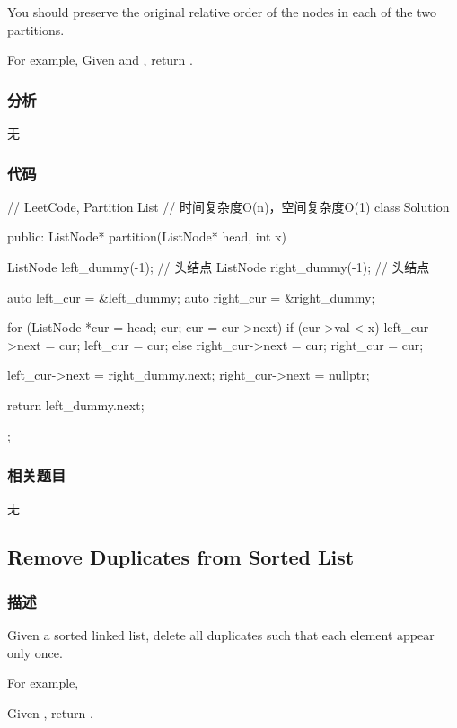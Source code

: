 You should preserve the original relative order of the nodes in each of the two 
partitions.

For example,
Given  and , return .


\subsubsection{分析}
无


\subsubsection{代码}
\begin{Code}
	// LeetCode, Partition List
	// 时间复杂度O(n)，空间复杂度O(1)
	class Solution {
		public:
		ListNode* partition(ListNode* head, int x) {
			ListNode left_dummy(-1); // 头结点
			ListNode right_dummy(-1); // 头结点
			
			auto left_cur = &left_dummy;
			auto right_cur = &right_dummy;
			
			for (ListNode *cur = head; cur; cur = cur->next) {
				if (cur->val < x) {
					left_cur->next = cur;
					left_cur = cur;
				} else {
				right_cur->next = cur;
				right_cur = cur;
			}
		}
		
		left_cur->next = right_dummy.next;
		right_cur->next = nullptr;
		
		return left_dummy.next;
	}
};
\end{Code}


\subsubsection{相关题目}

\begindot
\item 无
\myenddot


\subsection{Remove Duplicates from Sorted List}
\label{sec:remove-duplicates-from-sorted-list}


\subsubsection{描述}
Given a sorted linked list, delete all duplicates such that each element appear 
only once.

For example,

Given , return .

